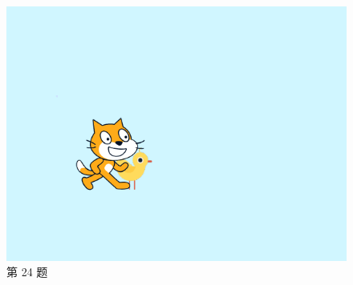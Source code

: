 \documentclass[10pt, a4paper]{article}
\begin{document}
\begin{enumerate}
\begin{figure}[htbp]
\begin{minipage}[t]{.26\textwidth}
\begin{minipage}[t]{.4\textwidth}
                \end{minipage}
                \caption*{第 24 题}
            \end{minipage}
            \begin{minipage}[t]{.35\textwidth}
                \centering
                \begin{minipage}[t]{.6\textwidth}
                    \centering
                    \includegraphics[width=\textwidth]{figure/25-1.png}
                \end{minipage}
                \begin{minipage}[t]{.35\textwidth}
                    \centering

\end{minipage}
\end{minipage}
\end{figure}
\end{enumerate}
\end{document}
